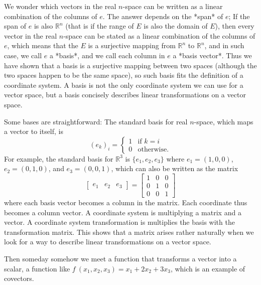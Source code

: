 We wonder which vectors in the real $n$-space
can be written as a linear combination of the columns of $e$.
The answer depends on the *span* of $e$;
If the span of $e$ is also $\mathbb{R}^n$
(that is if the range of $E$ is also the domain of $E$),
then every vector
in the real $n$-space can be stated as a linear combination of the columns of $e$,
which means that the $E$ is a surjective mapping from $\mathbb{R}^n$ to $\mathbb{R}^n$,
and in such case, we call $e$ a *basis*,
and we call each column in $e$ a *basis vector*.
Thus we have shown that a basis is a surjective mapping between two spaces
(although the two spaces happen to be the same space),
so such basis fits the definition of a coordinate system.
A basis is not the only coordinate system we can use for a vector space,
but a basis concisely describes linear transformations on a vector space.

Some bases are straightforward:
The standard basis for real $n$-space,
which maps a vector to itself, is
\[
(e_k)_i =
\begin{cases}
1 & \text{if }k = i
\\ 0 & \text{otherwise.}
\end{cases}
\]
For example, the standard basis for $\mathbb{R}^3$
is $\{e_1,e_2,e_3\}$
where $e_1 = (1,0,0)$, $e_2 = (0,1,0)$, and $e_3 = (0,0,1)$,
which can also be written as the matrix
\[
\begin{bmatrix}e_1&e_2&e_3\end{bmatrix}
= \begin{bmatrix}1&0&0\\0&1&0\\0&0&1\end{bmatrix}
\]
where each basis vector becomes a column in the matrix.
Each coordinate thus becomes a column vector.
A coordinate system is multiplying a matrix and a vector.
A coordinate system transformation is multiplies the basis with the transformation matrix.
This shows that a matrix arises rather naturally
when we look for a way to describe linear transformations on a vector space.

Then someday somehow we meet a function that transforms a vector into a scalar,
a function like $f~(x_1,x_2,x_3) = x_1 + 2 x_2 + 3 x_3$,
which is an example of covectors.


